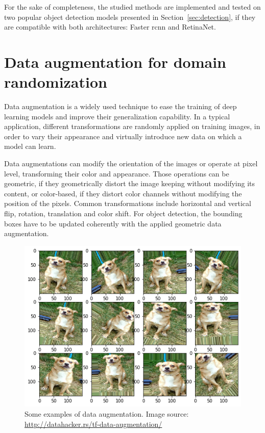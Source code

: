 \documentclass[%
    corpo=12pt,
    twoside,
    stile=classica,   
    tipotesi=magistrale,
    evenboxes,
    english,
	numerazioneromana,
]{toptesi}
\begin{document}
For the sake of completeness, the studied methods are implemented and tested on two popular object detection models presented in Section~\ref{sec:detection}, if they are compatible with both architectures: Faster \gls{rcnn} and RetinaNet.

\section{Data augmentation for domain randomization}\label{sec:dataaug}
Data augmentation is a widely used technique to ease the training of deep learning models and improve their generalization capability. In a typical application, different transformations are randomly applied on training images, in order to vary their appearance and virtually introduce new data on which a model can learn.

Data augmentations can modify the orientation of the images or operate at pixel level, transforming their color and appearance. Those operations can be geometric, if they geometrically distort the image keeping without modifying its content, or color-based, if they distort color channels without modifying the position of the pixels. Common transformations include horizontal and vertical flip, rotation, translation and color shift. For object detection, the bounding boxes have to be updated coherently with the applied geometric data augmentation.

\begin{figure}[ht!]
	\centering
	\includegraphics[width=0.8\linewidth]{imgs/augmentation.png}
	\caption[Some examples of data augmentation]{Some examples of data augmentation. Image source: \url{http://datahacker.rs/tf-data-augmentation/}}
	\label{fig:augmentation}
\end{figure}
\end{document}

